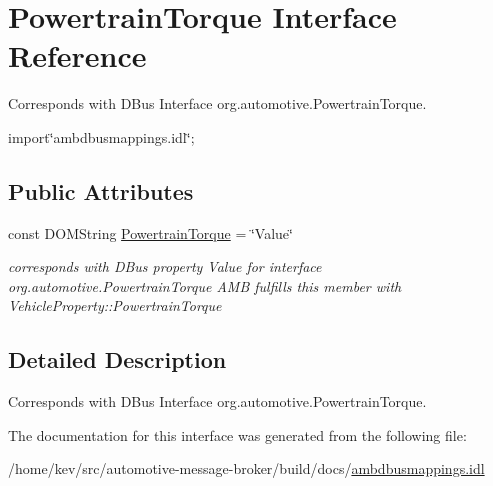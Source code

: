 \hypertarget{interfacePowertrainTorque}{\section{Powertrain\+Torque Interface Reference}
\label{interfacePowertrainTorque}
}


Corresponds with D\+Bus Interface org.\+automotive.\+Powertrain\+Torque.  




{\ttfamily import\char`\"{}ambdbusmappings.\+idl\char`\"{};}

\subsection*{Public Attributes}
\begin{DoxyCompactItemize}
\item 
\hypertarget{interfacePowertrainTorque_a05387795ceada91bcdd252b0f48e2232}{const D\+O\+M\+String \hyperlink{interfacePowertrainTorque_a05387795ceada91bcdd252b0f48e2232}{Powertrain\+Torque} = \char`\"{}Value\char`\"{}}\label{interfacePowertrainTorque_a05387795ceada91bcdd252b0f48e2232}

\begin{DoxyCompactList}\small\item\em corresponds with D\+Bus property Value for interface org.\+automotive.\+Powertrain\+Torque A\+M\+B fulfills this member with Vehicle\+Property\+::\+Powertrain\+Torque \end{DoxyCompactList}\end{DoxyCompactItemize}


\subsection{Detailed Description}
Corresponds with D\+Bus Interface org.\+automotive.\+Powertrain\+Torque. 

The documentation for this interface was generated from the following file\+:\begin{DoxyCompactItemize}
\item 
/home/kev/src/automotive-\/message-\/broker/build/docs/\hyperlink{ambdbusmappings_8idl}{ambdbusmappings.\+idl}\end{DoxyCompactItemize}
